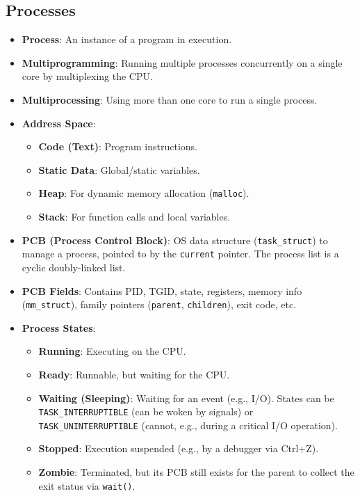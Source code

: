 \documentclass[8pt,a4paper]{article}
\begin{document}
\begin{multicols}{2}
\subsection*{Processes}
\begin{itemize}
    \item \textbf{Process}: An instance of a program in execution.
    \item \textbf{Multiprogramming}: Running multiple processes concurrently on a single core by multiplexing the CPU.
    \item \textbf{Multiprocessing}: Using more than one core to run a single process.
    \item \textbf{Address Space}:
        \begin{itemize}
            \item \textbf{Code (Text)}: Program instructions.
            \item \textbf{Static Data}: Global/static variables.
            \item \textbf{Heap}: For dynamic memory allocation (\texttt{malloc}).
            \item \textbf{Stack}: For function calls and local variables.
        \end{itemize}
    \item \textbf{PCB (Process Control Block)}: OS data structure (\texttt{task\_struct}) to manage a process, pointed to by the \texttt{current} pointer. The process list is a cyclic doubly-linked list.
    \item \textbf{PCB Fields}: Contains PID, TGID, state, registers, memory info (\texttt{mm\_struct}), family pointers (\texttt{parent}, \texttt{children}), exit code, etc.
    \item \textbf{Process States}:
    \begin{itemize}
        \item \textbf{Running}: Executing on the CPU.
        \item \textbf{Ready}: Runnable, but waiting for the CPU.
        \item \textbf{Waiting (Sleeping)}: Waiting for an event (e.g., I/O). States can be \texttt{TASK\_INTERRUPTIBLE} (can be woken by signals) or \texttt{TASK\_UNINTERRUPTIBLE} (cannot, e.g., during a critical I/O operation).
        \item \textbf{Stopped}: Execution suspended (e.g., by a debugger via Ctrl+Z).
        \item \textbf{Zombie}: Terminated, but its PCB still exists for the parent to collect the exit status via \texttt{wait()}.

\end{itemize}
\end{itemize}
\end{multicols}
\end{document}

